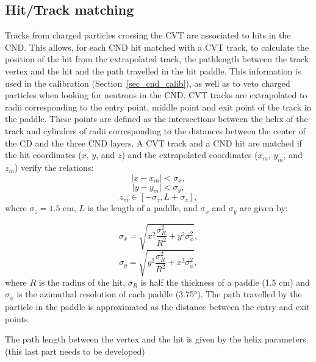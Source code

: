 \subsection{Hit/Track matching}
Tracks from charged particles crossing the CVT are associated to hits in the CND. This allows, for each CND hit matched with a CVT track, to calculate the position of the hit from the extrapolated track, the pathlength between the track vertex and the hit and the path travelled in the hit paddle. This information is used in the calibration (Section~\ref{sec_cnd_calib}), as well as to veto charged particles when looking for neutrons in the CND. 
CVT tracks are extrapolated to radii corresponding to the entry point, middle point and exit point of the track in the paddle. These points are defined as the intersections between the helix of the track and cylinders of radii corresponding to the distances between the center of the CD and the three CND layers.
A CVT track and a CND hit are matched if the hit coordinates ($x$, $y$, and $z$) and the extrapolated coordinates ($x_{m}$, $y_{m}$, and $z_{m}$) verify the relations:
\begin{equation}
\mid x-x_{m} \mid < \sigma_x ,
\end{equation}
\begin{equation}
\mid y-y_{m} \mid < \sigma_y ,
\end{equation}
\begin{equation}
z_{m}  \in [-\sigma_z,L+\sigma_z],
\end{equation}
where $\sigma_z=1.5$ cm, $ L$ is the length of a paddle, and $\sigma_x$ and $\sigma_y$ are given by:

\begin{equation}
\sigma_x= \sqrt{x^{2}\frac{\sigma_{R}^{2}}{R^2}+y^{2}\sigma_{\phi}^{2}},
\end{equation}
\begin{equation}
\sigma_y= \sqrt{y^{2}\frac{\sigma_{R}^{2}}{R^2}+x^{2}\sigma_{\phi}^{2}},
\end{equation}
where $R$ is the radius of the hit, $\sigma_R$ is half the thickness of a paddle (1.5 cm) and $\sigma_{\phi}$ is the azimuthal resolution of each paddle (3.75°).
%
The path travelled by the particle in the paddle is approximated as the distance between the entry and exit points.

The path length between the vertex and the hit is given by the helix parameters. (this last part needs to be developed)
